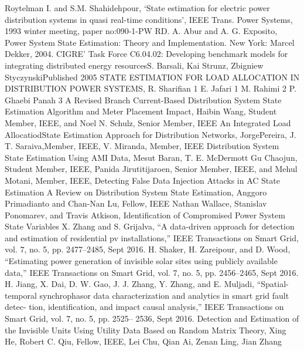 \begin{thebibliography}{00}
   Roytelman I. and S.M. Shahidehpour, ‘State estimation for electric power distribution systems in quasi real-time conditions’, IEEE Trans. Power Systems, 1993 winter meeting, paper no:090-1-PW RD.
   A. Abur and A. G. Exposito, Power System State Estimation: Theory and Implementation. New York: Marcel Dekker, 2004.
   CIGRE' Task Force C6.04.02: Developing benchmark models for integrating distributed energy resourcesS. Barsali, Kai Strunz, Zbigniew StyczynskiPublished 2005
   STATE ESTIMATION FOR LOAD ALLOCATION IN DISTRIBUTION POWER SYSTEMS, R. Sharifian 1 E. Jafari 1 M. Rahimi 2 P. Ghaebi Panah 3
   A Revised Branch Current-Based Distribution System State Estimation Algorithm and Meter Placement Impact, Haibin Wang, Student Member, IEEE, and Noel N. Schulz, Senior Member, IEEE
   An Integrated Load AllocatiodState Estimation Approach for Distribution Networks, JorgePereira, J. T. Saraiva,Member, IEEE, V. Miranda, Member, IEEE
   Distribution System State Estimation Using AMI Data, Mesut Baran, T. E. McDermott
   Gu Chaojun, Student Member, IEEE, Panida Jirutitijaroen, Senior Member, IEEE, and Mehul Motani, Member, IEEE, Detecting False Data Injection Attacks in AC State Estimation
   A Review on Distribution System State Estimation, Anggoro Primadianto and Chan-Nan Lu, Fellow, IEEE
   Nathan Wallace, Stanislav Ponomarev, and Travis Atkison, Identification of Compromised Power System State Variables
   X. Zhang and S. Grijalva, “A data-driven approach for detection and estimation of residential pv installations,” IEEE Transactions on Smart Grid, vol. 7, no. 5, pp. 2477–2485, Sept 2016.
   H. Shaker, H. Zareipour, and D. Wood, “Estimating power generation of invisible solar sites using publicly available data,” IEEE Transactions on Smart Grid, vol. 7, no. 5, pp. 2456–2465, Sept 2016.
   H. Jiang, X. Dai, D. W. Gao, J. J. Zhang, Y. Zhang, and E. Muljadi, “Spatial-temporal synchrophasor data characterization and analytics in smart grid fault detec- tion, identification, and impact causal analysis,” IEEE Transactions on Smart Grid, vol. 7, no. 5, pp. 2525– 2536, Sept 2016.
   Detection and Estimation of the Invisible Units Using Utility Data Based on Random Matrix Theory, Xing He, Robert C. Qiu, Fellow, IEEE, Lei Chu, Qian Ai, Zenan Ling, Jian Zhang
\end{thebibliography}

